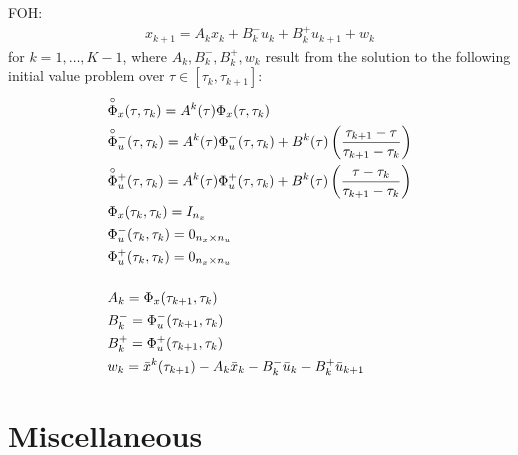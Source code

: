\documentclass[11pt,a4paper]{article}
\begin{document}
FOH:
\begin{align}
    x_{k+1} = A_kx_{k} + B^-_ku_k + B^+_ku_{k+1} + w_k     
\end{align}
for $k=1,\ldots,K-1$, where $A_k,B^-_k,B^+_k,w_k$ result from the solution to the following initial value problem over $\tau\in[\tau_k,\tau_{k+1}]$:
\begin{align*}
    & \overset{\circ}{\Phi}_x(\tau,\tau_k) = A^k(\tau)\Phi_x(\tau,\tau_k)\\ 
    & \overset{\circ}{\Phi}{}^-_u(\tau,\tau_k) = A^k(\tau)\Phi{}^-_u(\tau,\tau_k) + B^k(\tau)\left(\frac{\tau_{k+1}-\tau}{\tau_{k+1}-\tau_k}\right)\\
    & \overset{\circ}{\Phi}{}^+_u(\tau,\tau_k) = A^k(\tau)\Phi{}^+_u(\tau,\tau_k) + B^k(\tau)\left(\frac{\tau-\tau_k}{\tau_{k+1}-\tau_k}\right)\\
    & \Phi_x(\tau_k,\tau_k) = I_{n_x}\\
    & \Phi{}^-_u(\tau_k,\tau_k) = 0_{n_x\times n_u}\\
    & \Phi{}^+_u(\tau_k,\tau_k) = 0_{n_x\times n_u}\\[0.5cm]
    & A_k = \Phi_x(\tau_{k+1},\tau_k)\\
    & B_k^- = \Phi{}^-_u(\tau_{k+1},\tau_k)\\
    & B_k^+ = \Phi{}^+_u(\tau_{k+1},\tau_k)\\
    & w_k = \bar{x}^k(\tau_{k+1}) - A_k\bar{x}_k - B_k^-\bar{u}_{k} - B_{k}^+\bar{u}_{k+1} 
\end{align*}

\section{Miscellaneous}
\clearpage
\end{document}
